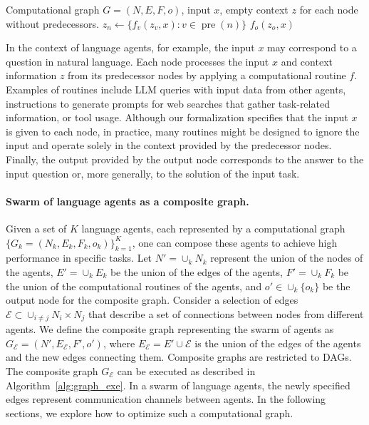 \documentclass{article}
\DeclareMathOperator{\pre}{pre}
\theoremstyle{plain}
\theoremstyle{definition}
\theoremstyle{remark}
\begin{document}
\vspace{-5pt}
\begin{algorithm}[h]
\begin{algorithmic}
\REQUIRE Computational graph $G = (N, E, F, o)$, input $x$, empty context $z$ for each node without predecessors.
\STATE $z_n \leftarrow \{f_v(z_v, x): v \in \pre(n)\}$ 
\ENDFOR
\ENSURE $f_o(z_o, x)$
\end{algorithmic}
\caption{Graph Execution}\label{alg:graph_exe}
\end{algorithm}

In the context of language agents, for example, the input $x$ may correspond to a question in natural language.
Each node processes the input $x$ and context information $z$ from its predecessor nodes by applying a computational routine $f$.
Examples of routines include LLM queries with input data from other agents, instructions to generate prompts for web searches that gather task-related information, or tool usage.
Although our formalization specifies that the input $x$ is given to each node, in practice, many routines might be designed to ignore the input and operate solely in the context provided by the predecessor nodes.
Finally, the output provided by the output node corresponds to the answer to the input question or, more generally, to the solution of the input task. 

\paragraph{Swarm of language agents as a composite graph.} Given a set of $K$ language agents, each represented by a computational graph $\{G_k=(N_k, E_k, F_k, o_k)\}_{k=1}^K$, one can compose these agents to achieve high performance in specific tasks.
Let $N'=\cup_k N_k$ represent the union of the nodes of the agents, $E' = \cup_k E_k$ be the union of the edges of the agents, $F'=\cup_k F_k$ be the union of the computational routines of the agents, and $o'\in \cup_k\{o_k\}$ be the output node for the composite graph.
Consider a selection of edges $\mathcal{E} \subset \cup_{i\neq j} N_i \times N_j$ that describe a set of connections between nodes from different agents.
We define the composite graph representing the swarm of agents as $G_{\mathcal{E}}=(N', E_{\mathcal{E}}, F', o')$, where $E_{\mathcal{E}} = E' \cup \mathcal{E}$ is the union of the edges of the agents and the new edges connecting them.
Composite graphs are restricted to DAGs.
The composite graph $G_{\mathcal{E}}$ can be executed as described in Algorithm~\ref{alg:graph_exe}.
In a swarm of language agents, the newly specified edges represent communication channels between agents.
In the following sections, we explore how to optimize such a computational graph.
\end{document}
